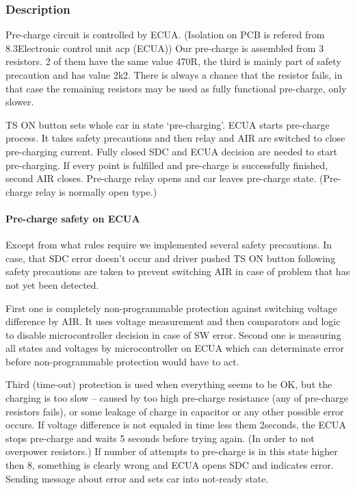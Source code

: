 \subsubsection{Description}
Pre-charge circuit is controlled by ECUA. (Isolation on PCB is refered from 8.3Electronic control unit acp (ECUA)) Our pre-charge is assembled from 3 resistors. 2 of them have the same value 470R, the third is mainly part of safety precaution and has value 2k2. There is always a chance that the resistor fails, in that case the remaining resistors may be used as fully functional pre-charge, only slower.

TS ON button sets whole car in state ‘pre-charging’. ECUA starts pre-charge process. It takes safety precautions and then relay and AIR are switched to close pre-charging current. Fully closed SDC and ECUA decision are needed to start pre-charging. If every point is fulfilled and pre-charge is successfully finished, second AIR closes. Pre-charge relay opens and car leaves pre-charge state. (Pre-charge relay is normally open type.)

\paragraph{Pre-charge safety on ECUA}
Except from what rules require we implemented several safety precautions. In case, that SDC error doesn’t occur and driver pushed TS ON button following safety precautions are taken to prevent switching AIR in case of problem that has not yet been detected.

First one is completely non-programmable protection against switching voltage difference by AIR. It uses voltage measurement and then comparators and logic to disable microcontroller decision in case of SW error.
Second one is measuring all states and voltages by microcontroller on ECUA which can determinate error before non-programmable protection would have to act.

Third (time-out) protection is used when everything seems to be OK, but the charging is too slow – caused by too high pre-charge resistance (any of pre-charge resistors fails), or some leakage of charge in capacitor or any other possible error occurs. If voltage difference is not equaled in time less them 2seconds, the ECUA stops pre-charge and waits 5 seconds before trying again. (In order to not overpower resistors.) If number of attempts to pre-charge is in this state higher then 8, something is clearly wrong and ECUA opens SDC and indicates error. Sending message about error and sets car into not-ready state.

